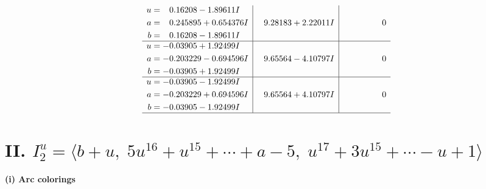 \documentclass[1p]{elsarticle_modified}
\theoremstyle{definition}
\begin{document}
$$\begin{array}{c|c|c}
\begin{aligned}
u &= \phantom{-}0.16208 - 1.89611 I \\
a &= \phantom{-}0.245895 + 0.654376 I \\
b &= \phantom{-}0.16208 - 1.89611 I\end{aligned}
 & \phantom{-}9.28183 + 2.22011 I & \phantom{-0.000000 } 0 \\ \hline\begin{aligned}
u &= -0.03905 + 1.92499 I \\
a &= -0.203229 - 0.694596 I \\
b &= -0.03905 + 1.92499 I\end{aligned}
 & \phantom{-}9.65564 - 4.10797 I & \phantom{-0.000000 } 0 \\ \hline\begin{aligned}
u &= -0.03905 - 1.92499 I \\
a &= -0.203229 + 0.694596 I \\
b &= -0.03905 - 1.92499 I\end{aligned}
 & \phantom{-}9.65564 + 4.10797 I & \phantom{-0.000000 } 0\\
 \hline 
 \end{array}$$\newpage\newpage\renewcommand{\arraystretch}{1}
\centering \section*{II. $I^u_{2}= \langle b+u,\;5 u^{16}+u^{15}+\cdots+a-5,\;u^{17}+3 u^{15}+\cdots- u+1 \rangle$}
\flushleft \textbf{(i) Arc colorings}\\
\end{document}
